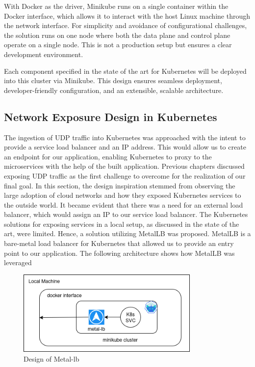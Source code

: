 With Docker as the driver, Minikube runs on a single container within the Docker interface, which allows it to interact with the host Linux machine through the network interface. For simplicity and avoidance of configurational challenges, the solution runs on one node where both the data plane and control plane operate on a single node. This is not a production setup but ensures a clear development environment.

Each component specified in the state of the art for Kubernetes will be deployed into this cluster via Minikube. This design ensures seamless deployment, developer-friendly configuration, and an extensible, scalable architecture.


\subsection{Network Exposure Design in Kubernetes}
The ingestion of UDP traffic into Kubernetes was approached with the intent to provide a service load balancer and an IP address. This would allow us to create an endpoint for our application, enabling Kubernetes to proxy to the microservices with the help of the built application. Previous chapters discussed exposing UDP traffic as the first challenge to overcome for the realization of our final goal. In this section, the design inspiration stemmed from observing the large adoption of cloud networks and how they exposed Kubernetes services to the outside world. It became evident that there was a need for an external load balancer, which would assign an IP to our service load balancer. The Kubernetes solutions for exposing services in a local setup, as discussed in the state of the art, were limited. Hence, a solution utilizing MetalLB was proposed. MetalLB is a bare-metal load balancer for Kubernetes that allowed us to provide an entry point to our application. The following architecture shows how MetalLB was leveraged



\begin{figure}[H]
\caption{Design of Metal-lb}
\centering
\includegraphics[width=0.8\textwidth]{Design/metal.png}
\end{figure}

